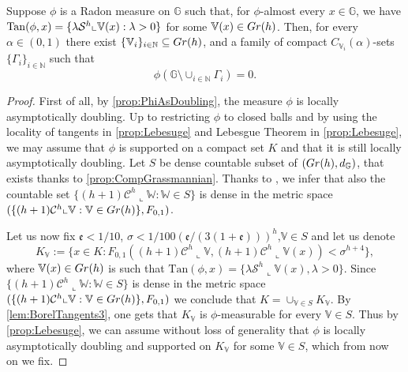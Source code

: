 \documentclass[10pt, a4paper,
oneside, headinclude,footinclude]{scrartcl}
\begin{document}
\begin{proposizione}\label{prop:TangentLocalizedCone}
Suppose $\phi$ is a Radon measure on $\mathbb{G}$ such that, for $\phi$-almost every $x\in\mathbb G$, we have $\mathrm{Tan}(\phi,x)=\{\lambda\mathcal{S}^h\llcorner \mathbb{V}(x):\lambda>0\}$ for some $\mathbb{V}(x)\in Gr(h)$. Then, for every $\alpha\in(0,1)$ there exist $\{\mathbb V_i\}_{i\in\mathbb N}\subseteq Gr(h)$, and a family of compact $C_{\mathbb V_i}(\alpha)$-sets $\{\Gamma_i\}_{i\in\mathbb N}$ such that 
$$
\phi(\mathbb G\setminus \cup_{i\in\mathbb N}\Gamma_i)=0.
$$
\end{proposizione}


\begin{proof}
First of all, by \cref{prop:PhiAsDoubling}, the measure $\phi$ is locally asymptotically doubling. Up to restricting $\phi$ to closed balls and by using the locality of tangents in \cref{prop:Lebesuge} and Lebesgue Theorem in \cref{prop:Lebesuge}, we may assume that $\phi$ is supported on a compact set $K$ and that it is still locally asymptotically doubling. Let $S$ be dense countable subset of $(Gr(h),d_\mathbb{G})$, that exists thanks to \cref{prop:CompGrassmannian}. Thanks to \cite[Proposition 2.29]{antonelli2020rectifiable}, we infer that also the countable set $\{(h+1)\mathcal{C}^{h}\llcorner \mathbb{W}:\mathbb{W}\in S\}$ is dense in the metric space $(\{(h+1)\mathcal{C}^{h}\llcorner \mathbb{V}:\mathbb{V}\in Gr(h)\},F_{0,1})$.


Let us now fix $\mathfrak{e}<1/10$, $\sigma<1/100(\mathfrak{e}/(3(1+\mathfrak{e})))^h$,$\mathbb V\in S$ and let us denote 
$$
K_{\mathbb V}:=\{x\in K:F_{0,1}((h+1)\mathcal{C}^h\llcorner \mathbb{V},(h+1)\mathcal{C}^h\llcorner \mathbb{V}(x))<\sigma^{h+4}\},
$$
where $\mathbb V(x)\in Gr(h)$ is such that $\mathrm{Tan}(\phi,x)=\{\lambda\mathcal{S}^h\llcorner\mathbb V(x),\lambda>0\}$. Since $\{(h+1)\mathcal{C}^{h}\llcorner \mathbb{W}:\mathbb{W}\in S\}$ is dense in the metric space $(\{(h+1)\mathcal{C}^{h}\llcorner \mathbb{V}:\mathbb{V}\in Gr(h)\},F_{0,1})$ we conclude that $K=\cup_{\mathbb V\in S}K_{\mathbb V}$. By \cref{lem:BorelTangents3}, one gets that $K_{\mathbb V}$ is $\phi$-measurable for every $\mathbb V\in S$. Thus by \cref{prop:Lebesuge},  we can assume without loss of generality that $\phi$ is locally asymptotically doubling and supported on $K_{\mathbb V}$ for some $\mathbb V\in S$, which from now on we fix.


\end{proof}
\end{document}
